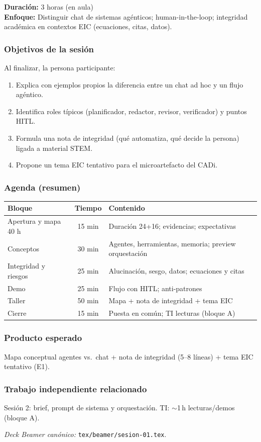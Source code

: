 \textbf{Duración:} 3 horas (en aula)\\
\textbf{Enfoque:} Distinguir chat de sistemas agénticos; human-in-the-loop; integridad académica en contextos EIC (ecuaciones, citas, datos).

\subsubsection*{Objetivos de la sesión}
Al finalizar, la persona participante:
\begin{enumerate}
\item Explica con ejemplos propios la diferencia entre un chat ad hoc y un flujo agéntico.
\item Identifica roles típicos (planificador, redactor, revisor, verificador) y puntos HITL.
\item Formula una nota de integridad (qué automatiza, qué decide la persona) ligada a material STEM.
\item Propone un tema EIC tentativo para el microartefacto del CADi.
\end{enumerate}

\subsubsection*{Agenda (resumen)}
\begin{tabularx}{\textwidth}{@{}lclX@{}}
\toprule
Bloque & Tiempo & Contenido \\
\midrule
Apertura y mapa 40 h & 15 min & Duración 24+16; evidencias; expectativas \\
Conceptos & 30 min & Agentes, herramientas, memoria; preview orquestación \\
Integridad y riesgos & 25 min & Alucinación, sesgo, datos; ecuaciones y citas \\
Demo & 25 min & Flujo con HITL; anti-patrones \\
Taller & 50 min & Mapa + nota de integridad + tema EIC \\
Cierre & 15 min & Puesta en común; TI lecturas (bloque A) \\
\bottomrule
\end{tabularx}

\subsubsection*{Producto esperado}
Mapa conceptual agentes vs.\ chat + nota de integridad (5--8 líneas) + tema EIC tentativo (E1).

\subsubsection*{Trabajo independiente relacionado}
Sesión 2: brief, prompt de sistema y orquestación. TI: $\sim$1\,h lecturas/demos (bloque A).

\textit{Deck Beamer canónico:} \texttt{tex/beamer/sesion-01.tex}.
